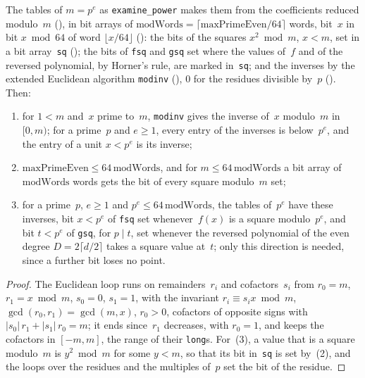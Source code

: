 \begin{lemma}\label{lem:modinv}
  \leanok
  The tables of $m = p^e$ as \verb|examine_power| makes them from the coefficients reduced
  modulo~$m$ (), in bit arrays of
  $\mathrm{modWords} = \lceil \mathrm{maxPrimeEven}/64 \rceil$ words, bit~$x$ in bit $x \bmod 64$
  of word $\lfloor x/64 \rfloor$ (): the bits of the squares
  $x^2 \bmod m$, $x < m$, set in a bit array~\verb|sq| (); the
  bits of \verb|fsq| and \verb|gsq| set where the values of~$f$ and of the reversed polynomial, by
  Horner's rule, are marked in~\verb|sq|; and the inverses by the extended Euclidean algorithm
  \verb|modinv| (), $0$ for the residues divisible by~$p$
  (). Then:
  \begin{enumerate}
    \item for $1 < m$ and~$x$ prime to~$m$, \verb|modinv| gives the inverse of~$x$ modulo~$m$ in
      $[0, m)$; for a prime~$p$ and $e \ge 1$, every entry of the inverses is below~$p^e$, and the
      entry of a unit $x < p^e$ is its inverse;
    \item $\mathrm{maxPrimeEven} \le 64\,\mathrm{modWords}$, and for $m \le 64\,\mathrm{modWords}$
      a bit array of $\mathrm{modWords}$ words gets the bit of every square modulo~$m$ set;
    \item for a prime~$p$, $e \ge 1$ and $p^e \le 64\,\mathrm{modWords}$, the tables of~$p^e$ have
      these inverses, bit $x < p^e$ of \verb|fsq| set whenever~$f(x)$ is a square modulo~$p^e$, and
      bit $t < p^e$ of \verb|gsq|, for $p \mid t$, set whenever the reversed polynomial of the even
      degree $D = 2 \lceil d/2 \rceil$ takes a square value at~$t$; only this direction is needed, since
      a further bit loses no point.
  \end{enumerate}
\end{lemma}

\begin{proof}
  \leanok
  The Euclidean loop runs on remainders~$r_i$ and cofactors~$s_i$ from $r_0 = m$, $r_1 = x \bmod m$,
  $s_0 = 0$, $s_1 = 1$, with the invariant $r_i \equiv s_i x \bmod m$,
  $\gcd(r_0, r_1) = \gcd(m, x)$, $r_0 > 0$, cofactors of opposite signs with
  $|s_0|\, r_1 + |s_1|\, r_0 = m$; it ends since~$r_1$ decreases, with $r_0 = 1$, and keeps the
  cofactors in $[-m, m]$, the range of their \verb|long|s. For~(3), a value that is a square
  modulo~$m$ is $y^2 \bmod m$ for some $y < m$, so that its bit in~\verb|sq| is set by~(2), and the
  loops over the residues and the multiples of~$p$ set the bit of the residue.
\end{proof}

